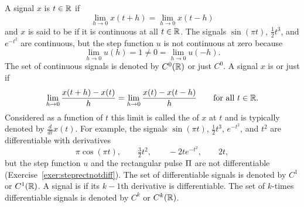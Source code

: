 A signal $x$ is  $t \in {\mathbb R}$ if
\[
\lim_{h \to 0} x(t + h) = \lim_{h \to 0} x(t-h)
\]
and $x$ is said to be  if it is continuous at all $t \in {\mathbb R}$.  The signals $\sin( \pi t)$, $\frac{1}{2} t^3$, and $e^{-t^2}$ are continuous, but the step function $u$ is not continuous at zero because
\[
\lim_{h \to 0} u(h) = 1 \neq 0 = \lim_{h \to 0} u(-h).
\]
The set of continuous signals is denoted by $C^0({\mathbb R})$ or just $C^0$.  A signal $x$ is  or just  if
\[
\lim_{h \to 0} \frac{x(t + h) - x(t)}{h} = \lim_{h \to 0} \frac{x(t) - x(t-h)}{h} \qquad \text{for all $t \in {\mathbb R}$}.
\]
Considered as a function of $t$ this limit is called the  of $x$ at $t$ and is typically denoted by $\frac{d}{dt} x(t)$.  For example, the signals $\sin( \pi t)$, $\frac{1}{2} t^3$, $e^{-t^2}$, and $t^2$ are differentiable with derivatives
\[
\pi \cos(\pi t), \qquad \tfrac{3}{2} t^{2}, \qquad -2t e^{-t^2}, \qquad 2t,
\] 
but the step function $u$ and the rectangular pulse $\Pi$ are not differentiable (Exercise~\ref{exer:steprectnotdiff}).  The set of differentiable signals is denoted by $C^1$ or $C^1({\mathbb R})$.  A signal is  if its $k-1$th derivative is differentiable.  The set of $k$-times differentiable signals is denoted by $C^k$ or $C^k({\mathbb R})$.


